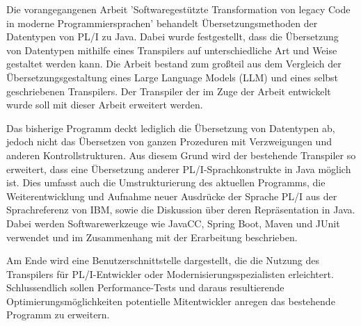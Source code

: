 Die vorangegangenen Arbeit 'Softwaregestützte Transformation von legacy Code in moderne Programmiersprachen' behandelt Übersetzungsmethoden der Datentypen von PL/I zu Java. Dabei wurde festgestellt, dass die Übersetzung von Datentypen mithilfe eines Transpilers auf unterschiedliche Art und Weise gestaltet werden kann. Die Arbeit bestand zum großteil aus dem Vergleich der Übersetzungsgestaltung eines Large Language Models (LLM) und eines selbst geschriebenen Transpilers. Der Transpiler der im Zuge der Arbeit entwickelt wurde soll mit dieser Arbeit erweitert werden.

Das bisherige Programm deckt lediglich die Übersetzung von Datentypen ab, jedoch nicht das Übersetzen von ganzen Prozeduren mit Verzweigungen und anderen Kontrollstrukturen. Aus diesem Grund wird der bestehende Transpiler so erweitert, dass eine Übersetzung anderer PL/I-Sprachkonstrukte in Java möglich ist. Dies umfasst auch die Umstrukturierung des aktuellen Programms, die Weiterentwicklung und Aufnahme neuer Ausdrücke der Sprache PL/I aus der Sprachreferenz von IBM, sowie die Diskussion über deren Repräsentation in Java. Dabei werden Softwarewerkzeuge wie JavaCC, Spring Boot, Maven und JUnit verwendet und im Zusammenhang mit der Erarbeitung beschrieben. 

Am Ende wird eine Benutzerschnittstelle dargestellt, die die Nutzung des Transpilers für PL/I-Entwickler oder Modernisierungsspezialisten erleichtert. Schlussendlich sollen Performance-Tests und daraus resultierende Optimierungsmöglichkeiten potentielle Mitentwickler anregen das bestehende Programm zu erweitern.

